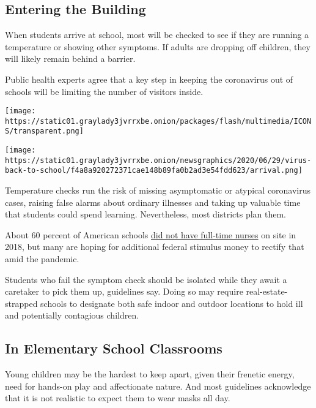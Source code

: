 \hypertarget{entering-the-building}{%
\subsection{Entering the Building}\label{entering-the-building}}

When students arrive at school, most will be checked to see if they are
running a temperature or showing other symptoms. If adults are dropping
off children, they will likely remain behind a barrier.

Public health experts agree that a key step in keeping the coronavirus
out of schools will be limiting the number of visitors inside.

\texttt{[image: https://static01.graylady3jvrrxbe.onion/packages/flash/multimedia/ICONS/transparent.png]}

\texttt{[image: https://static01.graylady3jvrrxbe.onion/newsgraphics/2020/06/29/virus-back-to-school/f4a8a920272371cae148b89fa0b2ad3e54fdd623/arrival.png]}

Temperature checks run the risk of missing asymptomatic or atypical
coronavirus cases, raising false alarms about ordinary illnesses and
taking up valuable time that students could spend learning.
Nevertheless, most districts plan them.

About 60 percent of American schools
\href{https://higherlogicdownload.s3.amazonaws.com/NASN/3870c72d-fff9-4ed7-833f-215de278d256/UploadedImages/PDFs/Advocacy/2017_Workforce_Study_Infographic_School_Nurses_in_the_Nation.pdf}{did
not have full-time nurses} on site in 2018, but many are hoping for
additional federal stimulus money to rectify that amid the pandemic.

Students who fail the symptom check should be isolated while they await
a caretaker to pick them up, guidelines say. Doing so may require
real-estate-strapped schools to designate both safe indoor and outdoor
locations to hold ill and potentially contagious children.

\hypertarget{in-elementary-school-classrooms}{%
\subsection{In Elementary School
Classrooms}\label{in-elementary-school-classrooms}}

Young children may be the hardest to keep apart, given their frenetic
energy, need for hands-on play and affectionate nature. And most
guidelines acknowledge that it is not realistic to expect them to wear
masks all day.

